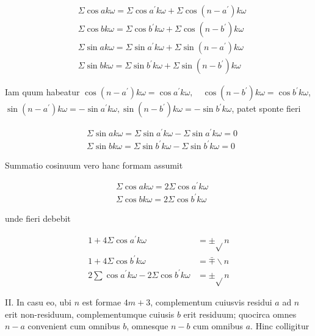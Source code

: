 \documentclass[10pt]{article}
\begin{document}
\[
\begin{aligned}
& \Sigma \cos a k \omega=\Sigma \cos a^{\prime} k \omega+\Sigma \cos \left(n-a^{\prime}\right) k \omega \\
& \Sigma \cos b k \omega=\Sigma \cos b^{\prime} k \omega+\Sigma \cos \left(n-b^{\prime}\right) k \omega \\
& \Sigma \sin a k \omega=\Sigma \sin a^{\prime} k \omega+\Sigma \sin \left(n-a^{\prime}\right) k \omega \\
& \Sigma \sin b k \omega=\Sigma \sin b^{\prime} k \omega+\Sigma \sin \left(n-b^{\prime}\right) k \omega
\end{aligned}
\]

Iam quum habeatur \(\cos \left(n-a^{\prime}\right) k \omega=\cos a^{\prime} k \omega, \quad \cos \left(n-b^{\prime}\right) k \omega=\cos b^{\prime} k \omega\), \(\sin \left(n-a^{\prime}\right) k \omega=-\sin a^{\prime} k \omega, \sin \left(n-b^{\prime}\right) k \omega=-\sin b^{\prime} k \omega\), patet sponte fieri

\[
\begin{aligned}
& \Sigma \sin a k \omega=\Sigma \sin a^{\prime} k \omega-\Sigma \sin a^{\prime} k \omega=0 \\
& \Sigma \sin b k \omega=\Sigma \sin b^{\prime} k \omega-\Sigma \sin b^{\prime} k \omega=0
\end{aligned}
\]

Summatio cosinuum vero hanc formam assumit

\[
\begin{aligned}
& \Sigma \cos a k \omega=2 \Sigma \cos a^{\prime} k \omega \\
& \Sigma \cos b k \omega=2 \Sigma \cos b^{\prime} k \omega
\end{aligned}
\]

unde fieri debebit

\[
\begin{aligned}
1+4 \Sigma \cos a^{\prime} k \omega & = \pm \sqrt{ } n \\
1+4 \Sigma \cos b^{\prime} k \omega & =\bar{\mp} \backslash n \\
2 \sum \cos a^{\prime} k \omega-2 \Sigma \cos b^{\prime} k \omega & = \pm \sqrt{ } n
\end{aligned}
\]

II. In casu eo, ubi \(n\) est formae \(4 m+3\), complementum cuiusvis residui \(a\) ad \(n\) erit non-residuum, complementumque cuiusis \(b\) erit residuum; quocirca omnes \(n-a\) convenient cum omnibus \(b\), omnesque \(n-b\) cum omnibus \(a\). Hinc colligitur
\end{document}

